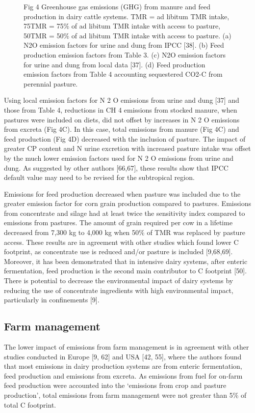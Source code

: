 \documentclass[11pt,a4paper]{article}
\begin{document}
\begin{figure}[h]
\caption{Fig 4 Greenhouse gas emissions (GHG) from manure and feed production in dairy cattle systems. TMR = ad libitum TMR intake, 75TMR = 75\% of ad libitum TMR intake with access to pasture, 50TMR = 50\% of ad libitum TMR intake with access to pasture. (a) N2O emission factors for urine and dung from IPCC [38]. (b) Feed production emission factors from Table 3. (c) N2O emission factors for urine and dung from local data [37]. (d) Feed production emission factors from Table 4 accounting sequestered CO2-C from perennial pasture.}
\end{figure}

Using local emission factors for N 2 O emissions from urine and dung [37] and those from Table 4, reductions in CH 4 emissions from stocked manure, when pastures were included on diets, did not offset by increases in N 2 O emissions from excreta (Fig 4C). In this case, total emissions from manure (Fig 4C) and feed production (Fig 4D) decreased with the inclusion of pasture. The impact of greater CP content and N urine excretion with increased pasture intake was offset by the much lower emission factors used for N 2 O emissions from urine and dung. As suggested by other authors [66,67], these results show that IPCC default value may need to be revised for the subtropical region.

Emissions for feed production decreased when pasture was included due to the greater emission factor for corn grain production compared to pastures. Emissions from concentrate and silage had at least twice the sensitivity index compared to emissions from pastures. The amount of grain required per cow in a lifetime decreased from 7,300 kg to 4,000 kg when 50\% of TMR was replaced by pasture access. These results are in agreement with other studies which found lower C footprint, as concentrate use is reduced and/or pasture is included [9,68,69]. Moreover, it has been demonstrated that in intensive dairy systems, after enteric fermentation, feed production is the second main contributor to C footprint [50]. There is potential to decrease the environmental impact of dairy systems by reducing the use of concentrate ingredients with high environmental impact, particularly in confinements [9].

\subsection{Farm management}

The lower impact of emissions from farm management is in agreement with other studies conducted in Europe [9, 62] and USA [42, 55], where the authors found that most emissions in dairy production systems are from enteric fermentation, feed production and emissions from excreta. As emissions from fuel for on-farm feed production were accounted into the ‘emissions from crop and pasture production’, total emissions from farm management were not greater than 5\% of total C footprint.
\end{document}
